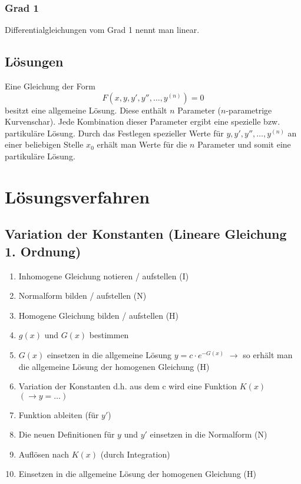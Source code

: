 \subsubsection{Grad 1}
Differentialgleichungen vom Grad 1 nennt man linear. 

\subsection{Lösungen}
Eine Gleichung der Form
\[ F(x, y, y', y'', \ldots, y^{(n)})=0 \]
besitzt eine allgemeine Lösung. Diese enthält $n$ Parameter ($n$-parametrige 
Kurvenschar). Jede Kombination dieser Parameter ergibt eine spezielle bzw. 
partikuläre Lösung. Durch das Festlegen spezieller Werte für 
$y, y', y'', \ldots, y^{(n)}$ an einer beliebigen Stelle $x_0$ erhält man Werte 
für die $n$ Parameter und somit eine partikuläre Lösung. 

\section{Lösungsverfahren}

\subsection{Variation der Konstanten (Lineare Gleichung 1. Ordnung)}
\begin{enumerate}
  \item Inhomogene Gleichung notieren / aufstellen (I)
  \item Normalform bilden / aufstellen (N)
  \item Homogene Gleichung bilden / aufstellen (H)
  \item $g(x)$ und $G(x)$ bestimmen
  \item $G(x)$ einsetzen in die allgemeine Lösung $y=c \cdot e^{-G(x)}$
        $\rightarrow$ so erhält man die allgemeine Lösung der 
        homogenen Gleichung (H)
  \item Variation der Konstanten d.h. aus dem c wird eine Funktion $K(x)$ 
        $(\rightarrow y= \ldots)$
  \item Funktion ableiten (für $y'$)
  \item Die neuen Definitionen für $y$ und $y'$ einsetzen in die Normalform (N) 
  \item Auflösen nach $K(x)$ (durch Integration)
  \item Einsetzen in die allgemeine Lösung der homogenen Gleichung (H)
\end{enumerate}